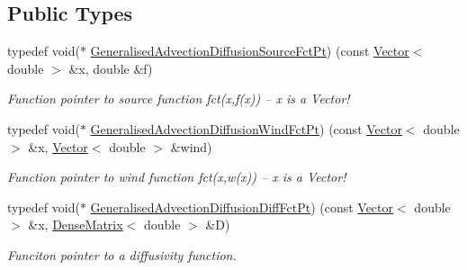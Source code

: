 \subsection*{Public Types}
\begin{DoxyCompactItemize}
\item 
typedef void($\ast$ \hyperlink{classoomph_1_1GeneralisedAdvectionDiffusionEquations_ad65d34bc0348f8b297c185d1772eafd9}{Generalised\+Advection\+Diffusion\+Source\+Fct\+Pt}) (const \hyperlink{classoomph_1_1Vector}{Vector}$<$ double $>$ \&x, double \&f)
\begin{DoxyCompactList}\small\item\em Function pointer to source function fct(x,f(x)) -- x is a Vector! \end{DoxyCompactList}\item 
typedef void($\ast$ \hyperlink{classoomph_1_1GeneralisedAdvectionDiffusionEquations_ac5a63eb03aee5957e7b14a4578423cfc}{Generalised\+Advection\+Diffusion\+Wind\+Fct\+Pt}) (const \hyperlink{classoomph_1_1Vector}{Vector}$<$ double $>$ \&x, \hyperlink{classoomph_1_1Vector}{Vector}$<$ double $>$ \&wind)
\begin{DoxyCompactList}\small\item\em Function pointer to wind function fct(x,w(x)) -- x is a Vector! \end{DoxyCompactList}\item 
typedef void($\ast$ \hyperlink{classoomph_1_1GeneralisedAdvectionDiffusionEquations_a637371a9eebc399023c6a652e8219263}{Generalised\+Advection\+Diffusion\+Diff\+Fct\+Pt}) (const \hyperlink{classoomph_1_1Vector}{Vector}$<$ double $>$ \&x, \hyperlink{classoomph_1_1DenseMatrix}{Dense\+Matrix}$<$ double $>$ \&D)
\begin{DoxyCompactList}\small\item\em Funciton pointer to a diffusivity function. \end{DoxyCompactList}\end{DoxyCompactItemize}
